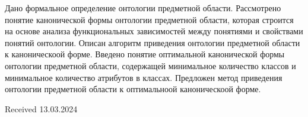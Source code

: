 \documentclass{scndocument}
\begin{document}
{Дано формальное определение онтологии предметной
области. Рассмотрено понятие канонической формы онтологии предметной области, которая строится на основе
анализа функциональных зависимостей между понятиями
и свойствами понятий онтологии. Описан алгоритм приведения онтологии предметной области к каноническоой
форме. Введено понятие оптимальной канонической формы
онтологии предметной области, содержащей минимальное
количество классов и минимальное количество атрибутов в
классах. Предложен метод приведения онтологии предметной области к оптимальноой каноническоой форме.}

\begin{flushright}
Received 13.03.2024
\end{flushright}
\end{document}
